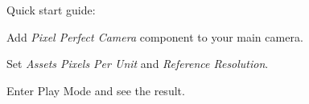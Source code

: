 Quick start guide\+:
\begin{DoxyEnumerate}
\item Add {\itshape Pixel Perfect Camera} component to your main camera.
\item Set {\itshape Assets Pixels Per Unit} and {\itshape Reference Resolution}.
\item Enter Play Mode and see the result. 
\end{DoxyEnumerate}